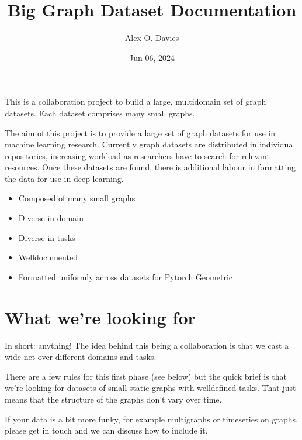 \documentclass[letterpaper,10pt,english]{sphinxhowto}
\title{Big Graph Dataset Documentation}
\date{Jun 06, 2024}
\author{Alex O. Davies}
\begin{document}
\pagestyle{empty}
\sphinxmaketitle
\pagestyle{plain}
\sphinxtableofcontents
\pagestyle{normal}
\label{\detokenize{index::doc}}


\sphinxAtStartPar
This is a collaboration project to build a large, multi\sphinxhyphen{}domain set of graph datasets.
Each dataset comprises many small graphs.

\sphinxAtStartPar
The aim of this project is to provide a large set of graph datasets for use in machine learning research.
Currently graph datasets are distributed in individual repositories, increasing workload as researchers have to search for relevant resources.
Once these datasets are found, there is additional labour in formatting the data for use in deep learning.
\begin{description}
\begin{itemize}
\item {} 
\sphinxAtStartPar
Composed of many small graphs

\item {} 
\sphinxAtStartPar
Diverse in domain

\item {} 
\sphinxAtStartPar
Diverse in tasks

\item {} 
\sphinxAtStartPar
Well\sphinxhyphen{}documented

\item {} 
\sphinxAtStartPar
Formatted uniformly across datasets for Pytorch Geometric

\end{itemize}

\end{description}


\section{What we’re looking for}
\label{\detokenize{index:what-we-re-looking-for}}
\sphinxAtStartPar
In short: anything! The idea behind this being a collaboration is that we cast a wide net over different domains and tasks.

\sphinxAtStartPar
There are a few rules for this first phase (see below) but the quick brief is that we’re looking for datasets of small static graphs with well\sphinxhyphen{}defined tasks.
That just means that the structure of the graphs don’t vary over time.

\sphinxAtStartPar
If your data is a bit more funky, for example multi\sphinxhyphen{}graphs or time\sphinxhyphen{}series on graphs, please get in touch and we can discuss how to include it.
\end{document}
